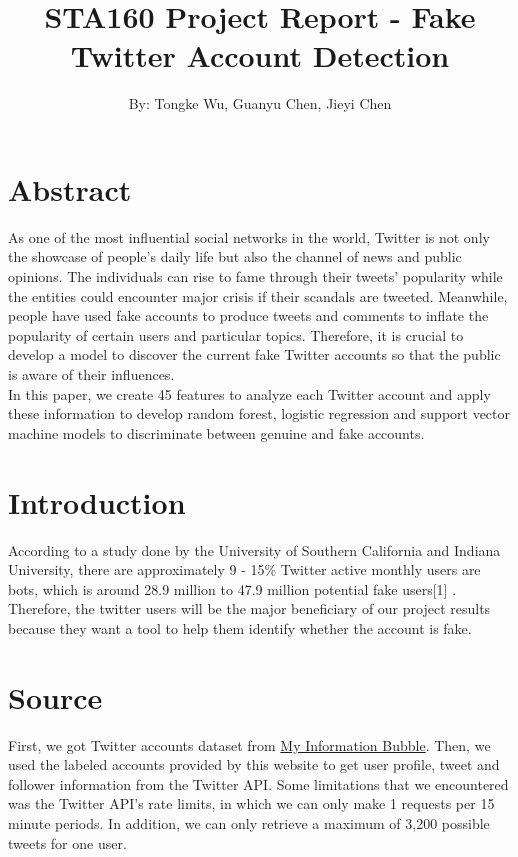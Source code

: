 \documentclass[a4paper, twoside, 12pt]{report}
\begin{document}
\title{STA160 Project Report - Fake Twitter Account Detection}
\maketitle
\author{By: Tongke Wu, Guanyu Chen, Jieyi Chen}

\section{Abstract}
As one of the most influential social networks in the world, Twitter is not only the showcase of people's daily life but also the channel of news and public opinions. The individuals can rise to fame through their tweets' popularity while the entities could encounter major crisis if their scandals are tweeted. Meanwhile, people have used fake accounts to produce tweets and comments to inflate the popularity of certain users and particular topics. Therefore, it is crucial to develop a model to discover the current fake Twitter accounts so that the public is aware of their influences.\\

\noindent In this paper, we create 45 features to analyze each Twitter account and apply these information to develop random forest, logistic regression and support vector machine models to discriminate between genuine and fake accounts.

\section{Introduction}
According to a study done by the University of Southern California and Indiana University, there are approximately 9 - 15\% Twitter active monthly users are bots, which is around 28.9 million to 47.9 million potential fake users[1] . Therefore, the twitter users will be the major beneficiary of our project results because they want a tool to help them identify whether the account is fake. 

\section{Source}
First, we got Twitter accounts dataset from \href{http://mib.projects.iit.cnr.it/dataset.html}{My Information Bubble}. Then, we used the labeled accounts provided by this website to get user profile, tweet and follower information from the Twitter API. Some limitations that we encountered was the Twitter API's rate limits, in which we can only make 1 requests per 15 minute periods. In addition, we can only retrieve a maximum of 3,200 possible tweets for one user.
\end{document}
